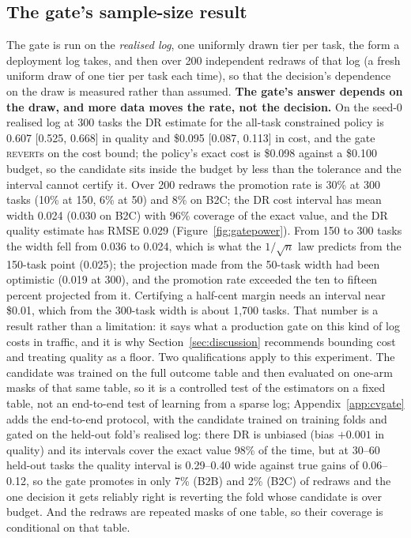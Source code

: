 \documentclass[10pt]{article}
\newcommand{\REVERT}{\textsc{revert}}
\newcommand{\finding}[1]{\textbf{\textcolor{pace}{#1}}}
\begin{document}
\subsection{The gate's sample-size result}
\label{sec:gate_body}

The gate is run on the \emph{realised log}, one uniformly drawn tier per task, the form a deployment log takes, and then over 200 independent redraws of that log (a fresh uniform draw of one tier per task each time), so that the decision's dependence on the draw is measured rather than assumed. \finding{The gate's answer depends on the draw, and more data moves the rate, not the decision.} On the seed-0 realised log at 300 tasks the DR estimate for the all-task constrained policy is 0.607 [0.525, 0.668] in quality and \$0.095 [0.087, 0.113] in cost, and the gate \REVERT{}s on the cost bound; the policy's exact cost is \$0.098 against a \$0.100 budget, so the candidate sits inside the budget by less than the tolerance and the interval cannot certify it. Over 200 redraws the promotion rate is 30\% at 300 tasks (10\% at 150, 6\% at 50) and 8\% on B2C; the DR cost interval has mean width 0.024 (0.030 on B2C) with 96\% coverage of the exact value, and the DR quality estimate has RMSE 0.029 (Figure~\ref{fig:gatepower}). From 150 to 300 tasks the width fell from 0.036 to 0.024, which is what the $1/\sqrt{n}$ law predicts from the 150-task point (0.025); the projection made from the 50-task width had been optimistic (0.019 at 300), and the promotion rate exceeded the ten to fifteen percent projected from it. Certifying a half-cent margin needs an interval near \$0.01, which from the 300-task width is about 1{,}700 tasks. That number is a result rather than a limitation: it says what a production gate on this kind of log costs in traffic, and it is why Section~\ref{sec:discussion} recommends bounding cost and treating quality as a floor. Two qualifications apply to this experiment. The candidate was trained on the full outcome table and then evaluated on one-arm masks of that same table, so it is a controlled test of the estimators on a fixed table, not an end-to-end test of learning from a sparse log; Appendix~\ref{app:cvgate} adds the end-to-end protocol, with the candidate trained on training folds and gated on the held-out fold's realised log: there DR is unbiased (bias $+0.001$ in quality) and its intervals cover the exact value 98\% of the time, but at 30--60 held-out tasks the quality interval is 0.29--0.40 wide against true gains of 0.06--0.12, so the gate promotes in only 7\% (B2B) and 2\% (B2C) of redraws and the one decision it gets reliably right is reverting the fold whose candidate is over budget. And the redraws are repeated masks of one table, so their coverage is conditional on that table.
\end{document}
